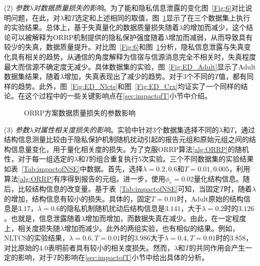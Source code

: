 (2) {\em 参数$\lambda$对数据质量损失的影响}。为了能和隐私信息泄露的变化图~\ref{Fig:6}对比说明问题，在此，对$\lambda$和$T$选定和上述相同的取值，图~\ref{Fig:7}显示了在三个数据集上执行的实验结果。总体上，基于失真量化的数据质量损失随着$\lambda$的增加而减少，这个结论可以被解释为ORRP机制提供的隐私保护强度随着$\lambda$增加而减弱，从而导致具有较少的失真，数据质量提升。对比图~\ref{Fig:6}和图~\ref{Fig:7}分析，隐私信息泄露与失真变化具有相关的趋势，从通信的角度解释为信宿与信源消息完全不相关时，失真程度最大而信源不确定度无减少。具体数据集的实验，图~\ref{Fig:ED_Adult}显示了Adult数据集结果，随着$\lambda$增加，失真表现出了减少的趋势。对于$3$个不同的$T$值，都有同样的趋势。此外，图~\ref{Fig:ED_Nlcts}和图~\ref{Fig:ED_Crx}均证实了一个同样的结论。在这个过程中的一些关键影响点在\ref{sec:impactofT}小节中介绍。
\begin{figure}[htbp]
\centering
{}%
%
%
\vspace{-0.3cm}
\centering
\caption{ORRP方案数据质量损失的参数影响}
\label{Fig:7}
\end{figure}
\vspace{-0.1cm}

(3) {\em 参数$\lambda$对属性相关度损失的影响}。实验中针对$3$个数据集选择不同的$\lambda$和$T$，通过结构信息测量比较由于隐私保护机制随机扰动引起的报告元组和原始元组之间的结构信息量变化，用于量化相关度的损失。为了克服ORRP算法\ref{alg:ORRP}的随机性，对于每一组选定的$\lambda$和$T$的组合重复执行$5$次实验。三个不同数据集的实验结果如表~\ref{Tab:impactofNSE}中数据。首先，选择$\lambda=0.2,0.6$和$T=0.01,0.005$，利用算法\ref{alg:ORRP}有序得到报告的元组。进一步，使用$\phi_{c}=0.02$量化结构信息。随后，比较结构信息的改变量。基于表~\ref{Tab:impactofNSE}可知，当固定$T$时，随着$\lambda$的增加，结构信息有较小的损失。具体的，固定$T=0.01$时，Adult原始的结构信息是$3.17$，$\lambda=0.6$的隐私机制随机扰动后结构信息是$3.141$，大于$\lambda=0.2$时的$3.126$。也就是，信息泄露随着$\lambda$增加而增加，而数据失真在减少。由此，在一定程度上，相关度损失随$\lambda$增加而减少。此外的两组实验，也有相似的结果。例如，NLTCS的实验结果，$\lambda = 0.6,T=0.01$时的$3.986$大于$\lambda = 0.4,T=0.01$时的$3.858$，对比原始的$4.0$表明前者具有较小的相关度损失。然而，$\lambda$和$T$的共同作用会产生一定的影响，对于$T$的影响在\ref{sec:impactofT}小节中给出具体的分析。

